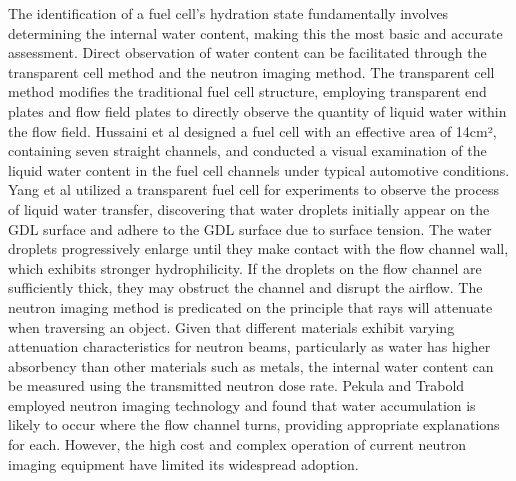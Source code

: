 \par
The identification of a fuel cell's hydration state fundamentally involves determining the internal water content, making this the most basic and accurate assessment. Direct observation of water content can be facilitated through the transparent cell method and the neutron imaging method. The transparent cell method modifies the traditional fuel cell structure, employing transparent end plates and flow field plates to directly observe the quantity of liquid water within the flow field\cite{leeVisualizationFloodingSingle2012}. Hussaini et al\cite{hussainiVisualizationQuantificationCathode2009} designed a fuel cell with an effective area of 14cm², containing seven straight channels, and conducted a visual examination of the liquid water content in the fuel cell channels under typical automotive conditions. Yang et al\cite{yangVisualizationLiquidWater2004} utilized a transparent fuel cell for experiments to observe the process of liquid water transfer, discovering that water droplets initially appear on the GDL surface and adhere to the GDL surface due to surface tension. The water droplets progressively enlarge until they make contact with the flow channel wall, which exhibits stronger hydrophilicity. If the droplets on the flow channel are sufficiently thick, they may obstruct the channel and disrupt the airflow. The neutron imaging method is predicated on the principle that rays will attenuate when traversing an object. Given that different materials exhibit varying attenuation characteristics for neutron beams, particularly as water has higher absorbency than other materials such as metals, the internal water content can be measured using the transmitted neutron dose rate. Pekula\cite{pekulaStudyWaterDistribution2005} and Trabold\cite{traboldSituInvestigationWater2006} employed neutron imaging technology and found that water accumulation is likely to occur where the flow channel turns, providing appropriate explanations for each. However, the high cost and complex operation of current neutron imaging equipment have limited its widespread adoption.

